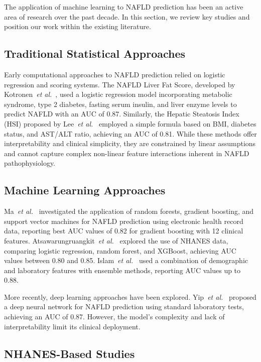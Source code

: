 \documentclass[conference,10pt]{IEEEtran}
\newcommand{\etal}{\textit{et al.}}
\begin{document}
The application of machine learning to NAFLD prediction has been an active area of research over the past decade. In this section, we review key studies and position our work within the existing literature.

\subsection{Traditional Statistical Approaches}

Early computational approaches to NAFLD prediction relied on logistic regression and scoring systems. The NAFLD Liver Fat Score, developed by Kotronen~\etal{}~\cite{kotronen2009prediction}, used a logistic regression model incorporating metabolic syndrome, type 2 diabetes, fasting serum insulin, and liver enzyme levels to predict NAFLD with an AUC of 0.87. Similarly, the Hepatic Steatosis Index (HSI) proposed by Lee~\etal{}~\cite{lee2010hepatic} employed a simple formula based on BMI, diabetes status, and AST/ALT ratio, achieving an AUC of 0.81. While these methods offer interpretability and clinical simplicity, they are constrained by linear assumptions and cannot capture complex non-linear feature interactions inherent in NAFLD pathophysiology.

\subsection{Machine Learning Approaches}

Ma~\etal{}~\cite{ma2021application} investigated the application of random forests, gradient boosting, and support vector machines for NAFLD prediction using electronic health record data, reporting best AUC values of 0.82 for gradient boosting with 12 clinical features. Atsawarungruangkit~\etal{}~\cite{atsawarungruangkit2021machine} explored the use of NHANES data, comparing logistic regression, random forest, and XGBoost, achieving AUC values between 0.80 and 0.85. Islam~\etal{}~\cite{islam2022machine} used a combination of demographic and laboratory features with ensemble methods, reporting AUC values up to 0.88.

More recently, deep learning approaches have been explored. Yip~\etal{}~\cite{yip2023laboratory} proposed a deep neural network for NAFLD prediction using standard laboratory tests, achieving an AUC of 0.87. However, the model's complexity and lack of interpretability limit its clinical deployment.

\subsection{NHANES-Based Studies}
\end{document}
